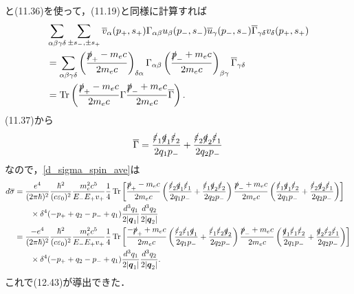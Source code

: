 と(11.36)を使って，(11.19)と同様に計算すれば
\begin{align}
  \begin{split}
    & \sum_{\alpha\beta\gamma\delta} \sum_{\pm s_-,\pm s_+} \overline{v}_\alpha(p_+,s_+) \Gamma_{\alpha\beta} u_\beta(p_-, s_-) \overline{u}_\gamma(p_-,s_-) \overline{\Gamma}_{\gamma\delta} v_\delta(p_+, s_+) \\
    &= \sum_{\alpha\beta\gamma\delta} \left( \frac{\slashed{p}_+ - m_ec}{2m_ec} \right)_{\delta\alpha} \Gamma_{\alpha\beta} \left( \frac{\slashed{p}_- + m_ec}{2m_ec} \right)_{\beta\gamma} \overline{\Gamma}_{\gamma\delta}\\
    &= \operatorname{Tr}\left( \frac{\slashed{p}_+ - m_ec}{2m_ec} \Gamma \frac{\slashed{p}_- + m_ec}{2m_ec} \overline{\Gamma} \right).
  \end{split}
\end{align}
(11.37)から
\begin{align}
  \overline{\Gamma} = \frac{\slashed{\varepsilon}_1\slashed{q}_1\slashed{\varepsilon}_2}{2q_1p_-} + \frac{\slashed{\varepsilon}_2\slashed{q}_2\slashed{\varepsilon}_1}{2q_2p_-}
\end{align}
なので，\eqref{d_sigma_spin_ave}は
\begin{align}
  \begin{split}
    d\overline{\sigma} &= \frac{e^4}{(2\pi\hbar)^2} \frac{\hbar^2}{(c\varepsilon_0)^2} \frac{m_e^2c^5}{E_-E_+v_+} \frac{1}{4}
    \operatorname{Tr}\left[ \frac{\slashed{p}_+ - m_ec}{2m_ec} \left(\frac{\slashed{\varepsilon}_2\slashed{q}_1\slashed{\varepsilon}_1}{2q_1p_-} + \frac{\slashed{\varepsilon}_1\slashed{q}_2\slashed{\varepsilon}_2}{2q_2p_-}\right) \frac{\slashed{p}_- + m_ec}{2m_ec} \left(\frac{\slashed{\varepsilon}_1\slashed{q}_1\slashed{\varepsilon}_2}{2q_1p_-} + \frac{\slashed{\varepsilon}_2\slashed{q}_2\slashed{\varepsilon}_1}{2q_2p_-}\right) \right] \\
    & \qquad\times \delta^4(-p_+ + q_2 - p_- + q_1) \frac{d^3q_1}{2\lvert\boldsymbol{q}_1\rvert} \frac{d^3q_2}{2\lvert\boldsymbol{q}_2\rvert}\\
    &= \frac{-e^4}{(2\pi\hbar)^2} \frac{\hbar^2}{(c\varepsilon_0)^2} \frac{m_e^2c^5}{E_-E_+v_+} \frac{1}{4}
    \operatorname{Tr}\left[ \frac{-\slashed{p}_+ + m_ec}{2m_ec} \left(\frac{\slashed{\varepsilon}_2\slashed{\varepsilon}_1\slashed{q}_1}{2q_1p_-} + \frac{\slashed{\varepsilon}_1\slashed{\varepsilon}_2\slashed{q}_2}{2q_2p_-}\right) \frac{\slashed{p}_- + m_ec}{2m_ec} \left(\frac{\slashed{q}_1\slashed{\varepsilon}_1\slashed{\varepsilon}_2}{2q_1p_-} + \frac{\slashed{q}_2\slashed{\varepsilon}_2\slashed{\varepsilon}_1}{2q_2p_-}\right) \right] \\
    & \qquad\times \delta^4(-p_+ + q_2 - p_- + q_1) \frac{d^3q_1}{2\lvert\boldsymbol{q}_1\rvert} \frac{d^3q_2}{2\lvert\boldsymbol{q}_2\rvert}.
  \end{split}
  \label{d_sigma_spin_aved}
\end{align}
これで(12.43)が導出できた．

